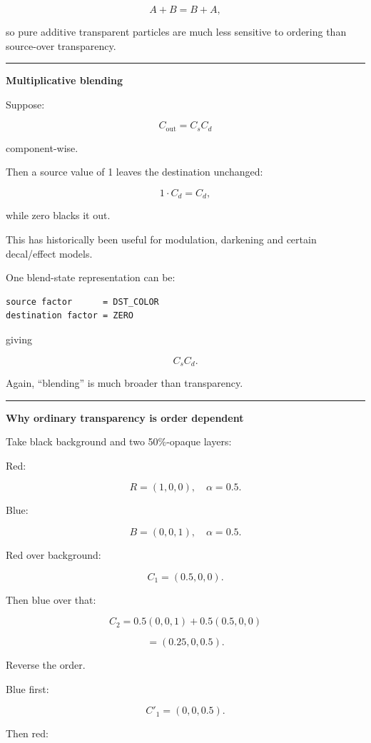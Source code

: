 \[
A+B=B+A,
\]

so pure additive transparent particles are much less sensitive to ordering than source-over transparency.

\begin{center}\rule{0.5\linewidth}{0.5pt}\end{center}

\textbf{Multiplicative blending}

Suppose:

\[
C_{\text{out}}=C_sC_d
\]

component-wise.

Then a source value of 1 leaves the destination unchanged:

\[
1\cdot C_d=C_d,
\]

while zero blacks it out.

This has historically been useful for modulation, darkening and certain decal/effect models.

One blend-state representation can be:

\begin{verbatim}
source factor      = DST_COLOR
destination factor = ZERO
\end{verbatim}

giving

\[
C_sC_d.
\]

Again, ``blending'' is much broader than transparency.

\begin{center}\rule{0.5\linewidth}{0.5pt}\end{center}

\textbf{Why ordinary transparency is order dependent}

Take black background and two 50\%-opaque layers:

Red:

\[
R=(1,0,0),\quad \alpha=0.5.
\]

Blue:

\[
B=(0,0,1),\quad \alpha=0.5.
\]

Red over background:

\[
C_1=(0.5,0,0).
\]

Then blue over that:

\[
C_2
=
0.5(0,0,1)+0.5(0.5,0,0)
\]

\[
=
(0.25,0,0.5).
\]

Reverse the order.

Blue first:

\[
C'_1=(0,0,0.5).
\]

Then red:

